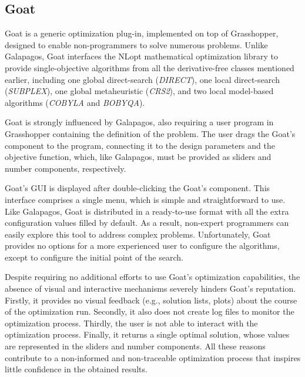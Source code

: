 	\subsection{Goat}
	Goat is a generic optimization plug-in, implemented on top of Grasshopper, designed to enable non\nobreakdash-\hspace{0pt}programmers to solve numerous problems.
	Unlike Galapagos, Goat interfaces the NLopt mathematical optimization library to provide single-objective algorithms from all the derivative-free classes mentioned earlier, including one global direct-search (\textit{\ac{DIRECT}}), one local direct-search (\textit{SUBPLEX}), one global metaheuristic (\textit{CRS2}), and two local model-based algorithms (\textit{\ac{COBYLA}} and \textit{\ac{BOBYQA}}). 
	
	Goat is strongly influenced by Galapagos, also requiring a user program in Grasshopper containing the definition of the problem. The user drags the Goat's component to the program, connecting it to the design parameters and the objective function, which, like Galapagos, must be provided as sliders and number components, respectively.
	
	Goat's \ac{GUI} is displayed after double-clicking the Goat's component. This interface comprises a single menu, which is simple and straightforward to use. Like Galapagos, Goat is distributed in a ready-to-use format with all the extra configuration values filled by default. As a result, non-expert programmers can easily explore this tool to address complex problems. Unfortunately, Goat provides no options for a more experienced user to configure the algorithms, except to configure the initial point of the search.
	
	Despite requiring no additional efforts to use Goat's optimization capabilities, the absence of visual and interactive mechanisms severely hinders Goat's reputation. Firstly, it provides no visual feedback (e.g., solution lists, plots) about the course of the optimization run. Secondly, it also does not create log files to monitor the optimization process. Thirdly, the user is not able to interact with the optimization process. Finally, it returns a single optimal solution, whose values are represented in the sliders and number components. All these reasons contribute to a non-informed and non-traceable optimization process that inspires little confidence in the obtained results. 
	
	
